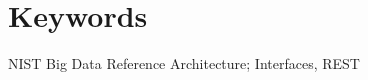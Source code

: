 \section*{\hfil  \hspace{4cm} Keywords \hfil}

NIST Big Data Reference Architecture;  Interfaces, REST
